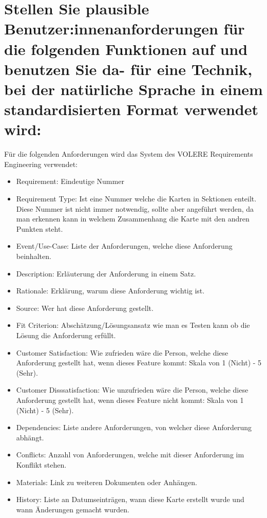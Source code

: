 \documentclass[12pt]{article}
\begin{document}
\section{Stellen Sie plausible Benutzer:innenanforderungen für die folgenden Funktionen auf und benutzen Sie da-
für eine Technik, bei der natürliche Sprache in einem standardisierten Format verwendet wird:}
Für die folgenden Anforderungen wird das System des VOLERE Requirements Engineering verwendet:
\begin{itemize}
 \item Requirement: Eindeutige Nummer
 \item Requirement Type: Ist eine Nummer welche die Karten in Sektionen enteilt. Diese Nummer ist nicht immer notwendig, sollte aber angeführt werden, da man erkennen kann in welchem Zusammenhang die Karte mit den andren Punkten steht.
 \item Event/Use-Case: Liste der Anforderungen, welche diese Anforderung beinhalten.
 \item Description: Erläuterung der Anforderung in einem Satz.
 \item Rationale: Erklärung, warum diese Anforderung wichtig ist.
 \item Source: Wer hat diese Anforderung gestellt.
 \item Fit Criterion: Abschätzung/Lösungsansatz wie man es Testen kann ob die Lösung die Anforderung erfüllt.
 \item Customer Satisfaction: Wie zufrieden wäre die Person, welche diese Anforderung gestellt hat, wenn dieses Feature kommt: Skala von 1 (Nicht) - 5 (Sehr).
 \item Customer Disssatisfaction: Wie unzufrieden wäre die Person, welche diese Anforderung gestellt hat, wenn dieses Feature nicht kommt: Skala von 1 (Nicht) - 5 (Sehr).
 \item Dependencies: Liste andere Anforderungen, von welcher diese Anforderung abhängt.
 \item Conflicts: Anzahl von Anforderungen, welche mit dieser Anforderung im Konflikt stehen.
 \item Materials: Link zu weiteren Dokumenten oder Anhängen.
 \item History: Liste an Datumseinträgen, wann diese Karte erstellt wurde und wann Änderungen gemacht wurden.
\end{itemize}
\cite{volere}
\pagebreak
\end{document}
